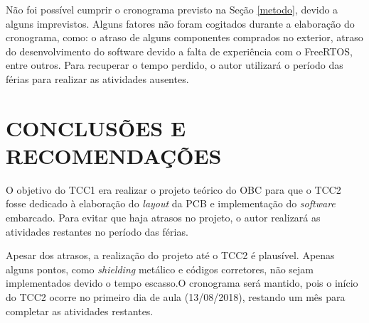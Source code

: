 Não foi possível cumprir o cronograma previsto na Seção \ref{metodo}, devido a alguns imprevistos. Alguns fatores não foram cogitados durante a elaboração do cronograma, como: o atraso de alguns componentes comprados no exterior, atraso do desenvolvimento do software devido a falta de experiência com o FreeRTOS, entre outros. Para recuperar o tempo perdido, o autor utilizará o período das férias para realizar as atividades ausentes. 


\chapter[CONCLUSÕES E RECOMENDAÇÕES]{CONCLUSÕES E RECOMENDAÇÕES}

O objetivo do TCC1 era realizar o projeto teórico do OBC para que o TCC2 fosse dedicado à elaboração do \textit{layout} da PCB e implementação do \textit{software} embarcado. Para evitar que haja atrasos no projeto, o autor realizará as atividades restantes no período das férias.

Apesar dos atrasos, a realização do projeto até o TCC2 é plausível. Apenas alguns pontos, como \textit{shielding} metálico e códigos corretores, não sejam implementados devido o tempo escasso.O cronograma será mantido, pois o início do TCC2 ocorre no primeiro dia de aula (13/08/2018), restando um mês para completar as atividades restantes.




